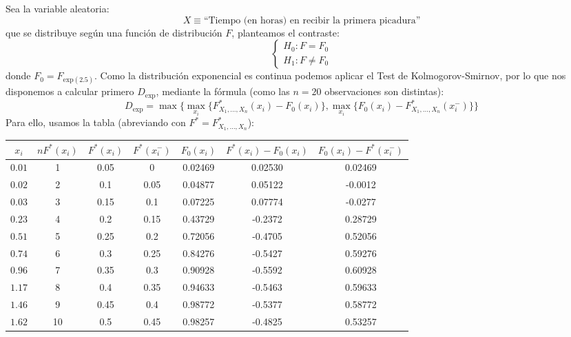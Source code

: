 \begin{ejercicio}
    \noindent
    Sea la variable aleatoria:
    \begin{equation*}
        X\equiv \text{``Tiempo (en horas) en recibir la primera picadura''}
    \end{equation*}
    que se distribuye según una función de distribución $F$, planteamos el contraste:
    \begin{equation*}
        \left\{\begin{array}{l}
            H_0:F=F_0 \\
            H_1:F\neq F_0
        \end{array}\right.
    \end{equation*}
    donde $F_0 = F_{\text{exp}(2.5)}$. Como la distribución exponencial es continua podemos aplicar el Test de Kolmogorov-Smirnov, por lo que nos disponemos a calcular primero $D_{\text{exp}}$, mediante la fórmula (como las $n=20$ observaciones son distintas):
    \begin{equation*}
        D_{\text{exp}} = \max\{\max_{x_i}\{F_{X_1,\ldots,X_n}^\ast(x_i)-F_0(x_i)\}, \max_{x_i}\{F_0(x_i)-F_{X_1,\ldots,X_n}^\ast(x_i^-)\}\}
    \end{equation*}
    Para ello, usamos la tabla (abreviando con $F^\ast = F_{X_1,\ldots,X_n}^\ast$):
    \begin{table}[H]
    \centering
    \begin{tabular}{|c|c|c|c|c|c|c|}
        \hline
        $x_i$ & $n F^\ast(x_i)$ & $F^\ast(x_i)$ & $F^\ast(x_i^-)$ & $F_0(x_i)$ & $F^\ast(x_i)-F_0(x_i)$ & $F_0(x_i) - F^\ast(x_i^-)$\\
        \hline
        $0.01$ & 1 & 0.05& 0    & 0.02469 & 0.02530 & 0.02469\\
        $0.02$ & 2 & 0.1 & 0.05 & 0.04877 & 0.05122 & -0.0012\\
        $0.03$ & 3 & 0.15& 0.1  & 0.07225 & 0.07774 & -0.0277\\
        $0.23$ & 4 & 0.2 & 0.15 & 0.43729 & -0.2372 & 0.28729\\
        $0.51$ & 5 & 0.25& 0.2  & 0.72056 & -0.4705 & 0.52056\\
        $0.74$ & 6 & 0.3 & 0.25 & 0.84276 & -0.5427 & 0.59276\\
        $0.96$ & 7 & 0.35& 0.3  & 0.90928 & -0.5592 & 0.60928\\
        $1.17$ & 8 & 0.4 & 0.35 & 0.94633 & -0.5463 & 0.59633\\
        $1.46$ & 9 & 0.45& 0.4  & 0.98772 & -0.5377 & 0.58772\\
        $1.62$ & 10& 0.5 & 0.45 & 0.98257 & -0.4825 & 0.53257\\

\end{tabular}
\end{table}
\end{ejercicio}
